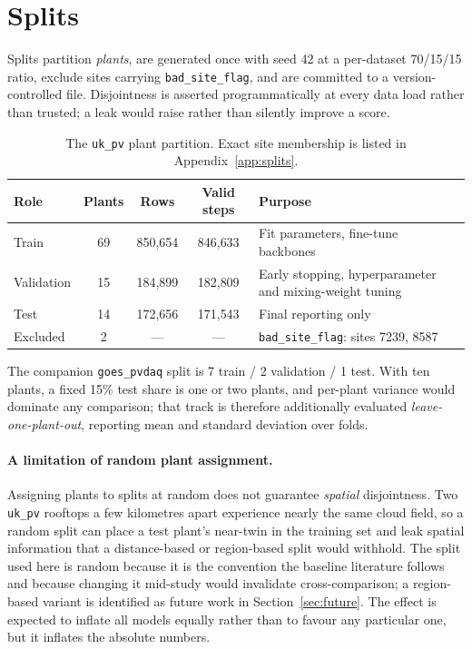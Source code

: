 \section{Splits}
\label{sec:splits}

Splits partition \emph{plants}, are generated once with seed 42 at a per-dataset
70/15/15 ratio, exclude sites carrying \texttt{bad\_site\_flag}, and are committed to a
version-controlled file. Disjointness is asserted programmatically at every data load
rather than trusted; a leak would raise rather than silently improve a score.

\begin{table}[h!]
\centering
\small
\begin{tabular}{l c c c p{5.2cm}}
\hline
\textbf{Role} & \textbf{Plants} & \textbf{Rows} & \textbf{Valid steps} & \textbf{Purpose} \\
\hline
Train & 69 & 850{,}654 & 846{,}633 & Fit parameters, fine-tune backbones \\
Validation & 15 & 184{,}899 & 182{,}809 & Early stopping, hyperparameter and mixing-weight
tuning \\
Test & 14 & 172{,}656 & 171{,}543 & Final reporting only \\
Excluded & 2 & --- & --- & \texttt{bad\_site\_flag}: sites 7239, 8587 \\
\hline
\end{tabular}
\caption{The \texttt{uk\_pv} plant partition. Exact site membership is listed in
Appendix~\ref{app:splits}.}
\label{tab:splits}
\end{table}

The companion \texttt{goes\_pvdaq} split is 7 train / 2 validation / 1 test. With ten
plants, a fixed 15\% test share is one or two plants, and per-plant variance would dominate
any comparison; that track is therefore additionally evaluated \emph{leave-one-plant-out},
reporting mean and standard deviation over folds.

\paragraph{A limitation of random plant assignment.} Assigning plants to splits at random
does not guarantee \emph{spatial} disjointness. Two \texttt{uk\_pv} rooftops a few
kilometres apart experience nearly the same cloud field, so a random split can place a test
plant's near-twin in the training set and leak spatial information that a
distance-based or region-based split would withhold. The split used here is random because
it is the convention the baseline literature follows and because changing it mid-study
would invalidate cross-comparison; a region-based variant is identified as future work in
Section~\ref{sec:future}. The effect is expected to inflate all models equally rather than
to favour any particular one, but it inflates the absolute numbers.

